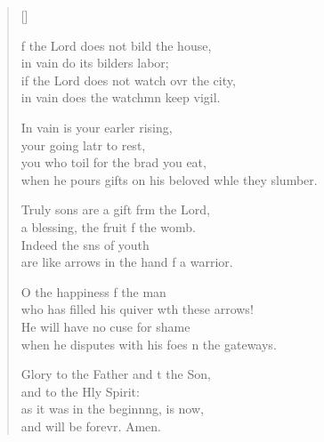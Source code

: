 \settowidth{\versewidth}{when he pours gifts on his beloved while they slumber.}
\begin{verse}[\versewidth]
  \begin{patverse}
f the Lord does not bild the house,\Med\\
in vain do its bilders labor;\\
if the Lord does not watch ovr the city,\Med\\
in vain does the watchmn keep vigil.

In vain is your earl\pointup{\i}er rising,\Med\\
your going latr to rest,\\
you who toil for the brad you eat,\Med\\
when he pours gifts on his beloved wh\pointup{\i}le they slumber.

Truly sons are a gift frm the Lord,\Med\\
a blessing, the fruit f the womb.\\
Indeed the sns of youth\Med\\
are like arrows in the hand f a warrior.

O the happiness f the man\Med\\
who has filled his quiver w\pointup{\i}th these arrows!\\
He will have no cuse for shame\Med\\
when he disputes with his foes \pointup{\i}n the gateways.

Glory to the Father and t the Son,\Med\\
and to the Hly Spirit:\\
as it was in the beginn\pointup{\i}ng, is now,\Med\\
and will be forevr. Amen. 
  \end{patverse}
\end{verse}
